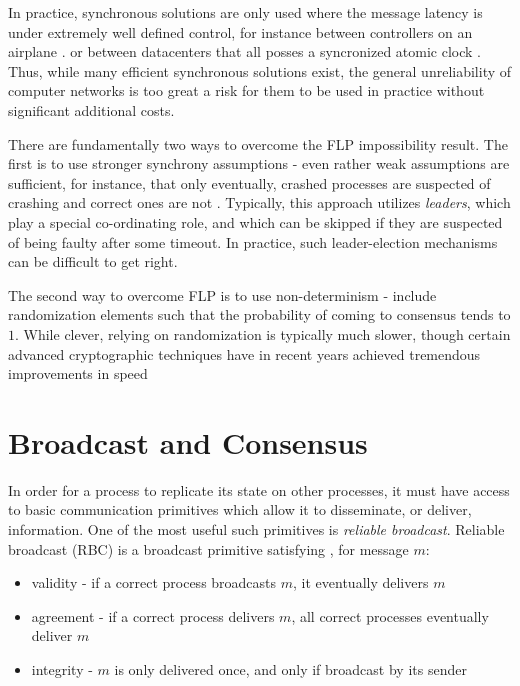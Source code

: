 In practice, synchronous solutions are only used where the message latency is under 
extremely well defined control, for instance between controllers on an airplane \cite{hoyme1993safebus}.
or between datacenters that all posses a syncronized atomic clock \cite{corbett2013spanner}.
Thus, while many efficient synchronous solutions exist,
the general unreliability of computer networks is too great a risk for them to be used in practice
without significant additional costs.

There are fundamentally two ways to overcome the FLP impossibility result.
The first is to use stronger synchrony assumptions - 
even rather weak assumptions are sufficient, 
for instance, that only eventually, 
crashed processes are suspected of crashing and correct ones are not \cite{chandra1996unreliable}.
Typically, this approach utilizes \emph{leaders}, 
which play a special co-ordinating role, 
and which can be skipped if they are suspected of being faulty after some timeout.
In practice, such leader-election mechanisms can be difficult to get right.

The second way to overcome FLP is to use non-determinism - 
include randomization elements such that
the probability of coming to consensus tends to $1$.
While clever, relying on randomization is typically much slower, 
though certain advanced cryptographic techniques have in recent years
achieved tremendous improvements in speed \cite{honeybadger}


\section{Broadcast and Consensus}

In order for a process to replicate its state on other processes, 
it must have access to basic communication primitives which allow it to disseminate, or deliver, information.
One of the most useful such primitives is \emph{reliable broadcast}.
Reliable broadcast (RBC) is a broadcast primitive satisfying \cite{chandra1996unreliable}, for message $m$:

\begin{itemize}
\item validity - if a correct process broadcasts $m$, it eventually delivers $m$
\item agreement - if a correct process delivers $m$, all correct processes eventually deliver $m$
\item integrity - $m$ is only delivered once, and only if broadcast by its sender
\end{itemize}

